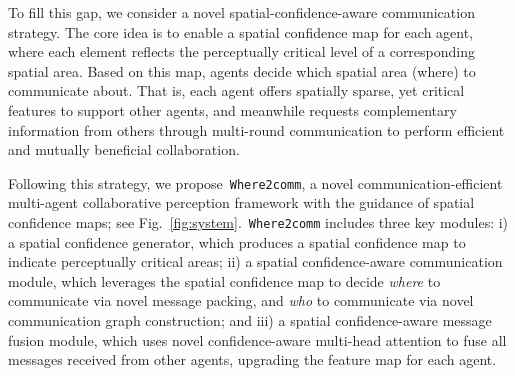 



To fill this gap, we consider a novel spatial-confidence-aware communication strategy. The core idea is to enable a spatial confidence map for each agent, where each element reflects the perceptually critical level of a corresponding spatial area. Based on this map, agents decide which spatial area (where) to communicate about. That is, each agent offers spatially sparse, yet critical features to support other agents, and meanwhile requests complementary information from others through multi-round communication to perform efficient and mutually beneficial collaboration.


Following this strategy, we propose~\texttt{Where2comm}, a novel communication-efficient multi-agent collaborative perception framework with the guidance of spatial confidence maps; see Fig.~\ref{fig:system}.~\texttt{Where2comm} includes three key modules: i) a spatial confidence generator, which produces a spatial confidence map to indicate perceptually critical areas; ii) a spatial confidence-aware communication module, which leverages the spatial confidence map to decide \textit{where} to communicate via novel message packing, and \textit{who} to communicate via novel communication graph construction; and iii) a spatial confidence-aware message fusion module, which uses novel confidence-aware multi-head attention to fuse all messages received from other agents, upgrading the feature map for each agent.


